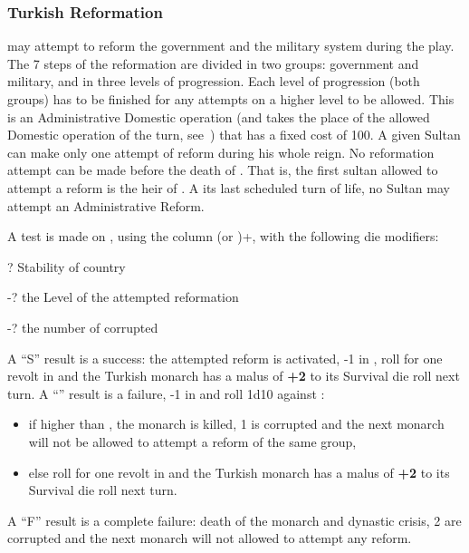 \subsubsection{Turkish Reformation}
 \TUR may attempt to reform the
government and the military system during the play.  The 7 steps of the
reformation are divided in two groups: government and military, and in
three levels of progression. Each level of progression (both groups) has
to be finished for any attempts on a higher level to be allowed.
\bparag This is an Administrative Domestic operation (and takes the
place of the allowed Domestic operation of the turn,
see~) that has a fixed cost of
100\ducats.
\bparag A given Sultan can make only one attempt of reform during his
whole reign.
\bparag No reformation attempt can be made before the death of
. That is, the first sultan allowed to attempt a
reform is the heir of .
\bparag A its last scheduled turn of life, no Sultan may attempt an
Administrative Reform.

\aparag A test is made on ,
using the column (\MIL or \ADM)+, with the following die
modifiers:
\begin{modlist}
\item[\textpm?] Stability of country
\item[-?] the Level of the attempted reformation
\item[-?]  the number of corrupted \Pashas
\end{modlist}
\bparag A ``S'' result is a success: the attempted reform is activated,
-1 in \STAB, roll for one revolt in \TUR and the Turkish monarch has a
malus of {\bf +2} to its Survival die roll next turn.
\bparag A ``\undemi'' result is a failure, -1 in \STAB and roll 1d10
against \FTI:
\begin{itemize}
\item if higher than \FTI, the monarch is killed, 1 \Pasha is corrupted
  and the next monarch will not be allowed to attempt a reform of the
  same group,
\item else roll for one revolt in \TUR and the Turkish monarch has a
  malus of {\bf +2} to its Survival die roll next turn.
\end{itemize}
\bparag A ``F'' result is a complete failure: death of the monarch and
dynastic crisis, 2 \Pashas are corrupted and the next monarch will not
allowed to attempt any reform.

